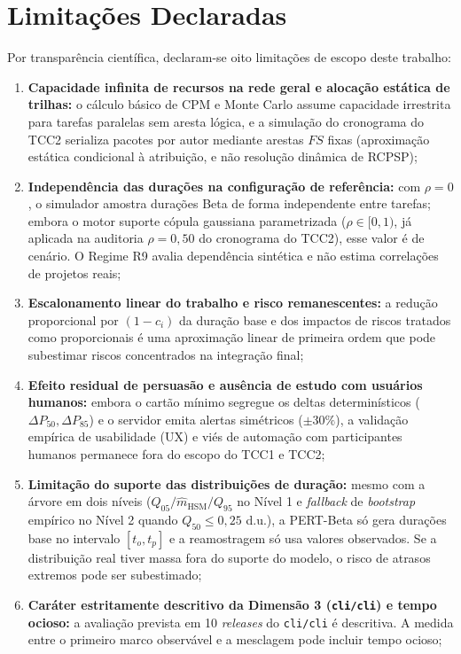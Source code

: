 \documentclass[12pt,openany,oneside,a4paper,english,brazilian,sumario=tradicional]{abntex2}
\begin{document}
\section{Limitações Declaradas}\label{sec:limitacoes}

Por transparência científica, declaram-se oito limitações de escopo deste trabalho:
\begin{enumerate}
  \item \textbf{Capacidade infinita de recursos na rede geral e alocação estática de trilhas:} o cálculo básico de CPM e Monte Carlo assume capacidade irrestrita para tarefas paralelas sem aresta lógica, e a simulação do cronograma do TCC2 serializa pacotes por autor mediante arestas $FS$ fixas (aproximação estática condicional à atribuição, e não resolução dinâmica de RCPSP);
  \item \textbf{Independência das durações na configuração de referência:} com $\rho=0$, o simulador amostra durações Beta de forma independente entre tarefas; embora o motor suporte cópula gaussiana parametrizada ($\rho \in [0, 1)$, já aplicada na auditoria $\rho=0{,}50$ do cronograma do TCC2), esse valor é de cenário. O Regime R9 avalia dependência sintética e não estima correlações de projetos reais;
  \item \textbf{Escalonamento linear do trabalho e risco remanescentes:} a redução proporcional por $(1-c_i)$ da duração base e dos impactos de riscos tratados como proporcionais é uma aproximação linear de primeira ordem que pode subestimar riscos concentrados na integração final;
  \item \textbf{Efeito residual de persuasão e ausência de estudo com usuários humanos:} embora o cartão mínimo segregue os deltas determinísticos ($\Delta P_{50}, \Delta P_{85}$) e o servidor emita alertas simétricos ($\pm 30\%$), a validação empírica de usabilidade (UX) e viés de automação com participantes humanos permanece fora do escopo do TCC1 e TCC2;
  \item \textbf{Limitação do suporte das distribuições de duração:} mesmo com a árvore em dois níveis ($Q_{05}/\hat{m}_{\mathrm{HSM}}/Q_{95}$ no Nível 1 e \textit{fallback} de \textit{bootstrap} empírico no Nível 2 quando $Q_{50} \le 0{,}25$ d.u.), a PERT-Beta só gera durações base no intervalo $[t_o,t_p]$ e a reamostragem só usa valores observados. Se a distribuição real tiver massa fora do suporte do modelo, o risco de atrasos extremos pode ser subestimado;
  \item \textbf{Caráter estritamente descritivo da Dimensão 3 (\texttt{cli/cli}) e tempo ocioso:} a avaliação prevista em 10 \textit{releases} do \texttt{cli/cli} é descritiva. A medida entre o primeiro marco observável e a mesclagem pode incluir tempo ocioso;

\end{enumerate}
\end{document}
